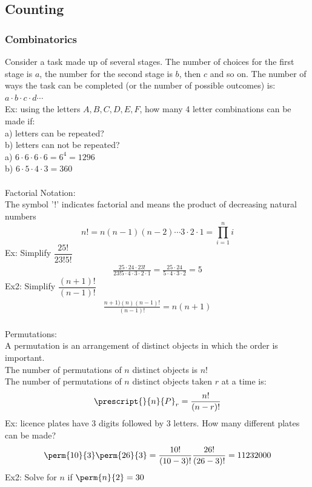 \subsection{Counting}

\subsubsection{Combinatorics}
Consider a task made up of several stages. The number of choices for the first stage is $a$, the number for the second stage is $b$, then $c$ and so on. The number of ways the task can be completed (or the number of possible outcomes) is: $a\cdot b\cdot c\cdot d\cdots$\\
Ex: using the letters $A, B, C,D,E,F$, how many 4 letter combinations can be made if:\\
a) letters can be repeated?\\
b) letters can not be repeated?\\
a) $6\cdot6\cdot6\cdot6=6^4=1296$\\
b) $6\cdot5\cdot4\cdot3=360$\\
\\
Factorial Notation:\\
The symbol '!' indicates factorial and means the product of decreasing natural numbers
$$n!=n(n-1)(n-2)\cdots3\cdot2\cdot1=\prod_{i=1}^ni$$
Ex: Simplify $\dfrac{25!}{23!5!}$
\begin{align*}
    \frac{25\cdot24\cdot23!}{23!5\cdot4\cdot3\cdot2\cdot1}=\frac{25\cdot24}{5\cdot4\cdot3\cdot2}=5
\end{align*}
Ex2: Simplify $\dfrac{(n+1)!}{(n-1)!}$
\begin{align*}
    \frac{n+1)(n)(n-1)!}{(n-1)!}=n(n+1)
\end{align*}
\\
Permutations:\\
A permutation is an arrangement of distinct objects in which the order is important.\\
The number of permutations of $n$ distinct objects is $n!$\\
The number of permutations of $n$ distinct objects taken $r$ at a time is:
$$\prescript{}{n}{P}_r=\frac{n!}{(n-r)!}$$
Ex: licence plates have 3 digits followed by 3 letters. How many different plates can be made?\\
\begin{align*}
    \perm{10}{3}\perm{26}{3}=\frac{10!}{(10-3)!}\frac{26!}{(26-3)!}=11232000
\end{align*}
Ex2: Solve for $n$ if $\perm{n}{2}=30$
